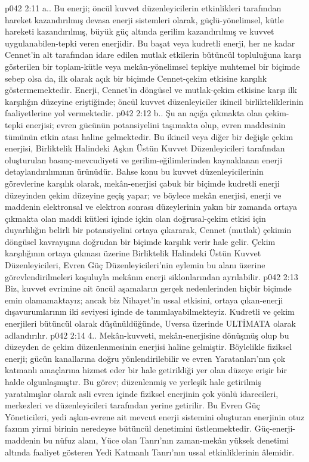 \vs p042 2:11 a.\bibnobreakspace {}. Bu enerji; öncül kuvvet düzenleyicilerin etkinlikleri tarafından hareket kazandırılmış devasa enerji sistemleri olarak, güçlü\hyp{}yönelimsel, kütle hareketi kazandırılmış, büyük güç altında gerilim kazandırılmış ve kuvvet uygulanabilen\hyp{}tepki veren enerjidir. Bu başat veya kudretli enerji, her ne kadar Cennet’in alt tarafından idare edilen mutlak etkilerin bütüncül topluluğuna karşı gösterilen bir toplam\hyp{}kütle veya mekân\hyp{}yönelimsel tepkiye muhtemel bir biçimde sebep olsa da, ilk olarak açık bir biçimde Cennet\hyp{}çekim etkisine karşılık göstermemektedir. Enerji, Cennet’in döngüsel ve mutlak\hyp{}çekim etkisine karşı ilk karşılığın düzeyine eriştiğinde; öncül kuvvet düzenleyiciler ikincil birlikteliklerinin faaliyetlerine yol vermektedir.
\vs p042 2:12 b.\bibnobreakspace {}. Şu an açığa çıkmakta olan çekim\hyp{}tepki enerjisi; evren gücünün potansiyelini taşımakta olup, evren maddesinin tümünün etkin atası haline gelmektedir. Bu ikincil veya diğer bir değişle çekim enerjisi, Birliktelik Halindeki Aşkın Üstün Kuvvet Düzenleyicileri tarafından oluşturulan basınç\hyp{}mevcudiyeti ve gerilim\hyp{}eğilimlerinden kaynaklanan enerji detaylandırılımının ürünüdür. Bahse konu bu kuvvet düzenleyicilerinin görevlerine karşılık olarak, mekân\hyp{}enerjisi çabuk bir biçimde kudretli enerji düzeyinden çekim düzeyine geçiş yapar; ve böylece mekân enerjisi, enerji ve maddenin elektronsal ve elektron sonrası düzeylerinin yakın bir zamanda ortaya çıkmakta olan maddi kütlesi içinde içkin olan doğrusal\hyp{}çekim etkisi için duyarlılığın belirli bir potansiyelini ortaya çıkararak, Cennet (mutlak) çekimin döngüsel kavrayışına doğrudan bir biçimde karşılık verir hale gelir. Çekim karşılığının ortaya çıkması üzerine Birliktelik Halindeki Üstün Kuvvet Düzenleyicileri, Evren Güç Düzenleyicileri’nin eylemin bu alanı üzerine görevlendirilmeleri koşuluyla mekânın enerji siklonlarından ayrılabilir.
\vs p042 2:13 Biz, kuvvet evrimine ait öncül aşamaların gerçek nedenlerinden hiçbir biçimde emin olamamaktayız; ancak biz Nihayet’in ussal etkisini, ortaya çıkan\hyp{}enerji dışavurumlarının iki seviyesi içinde de tanımlayabilmekteyiz. Kudretli ve çekim enerjileri bütüncül olarak düşünüldüğünde, Uversa üzerinde ULTİMATA olarak adlandırılır.
\vs p042 2:14 4.\bibnobreakspace {}. Mekân\hyp{}kuvveti, mekân\hyp{}enerjisine dönüşmüş olup bu düzeyden de çekim düzenlenmesinin enerjisi haline gelmiştir. Böylelikle fiziksel enerji; gücün kanallarına doğru yönlendirilebilir ve evren Yaratanları’nın çok katmanlı amaçlarına hizmet eder bir hale getirildiği yer olan düzeye erişir bir halde olgunlaşmıştır. Bu görev; düzenlenmiş ve yerleşik hale getirilmiş yaratılmışlar olarak asli evren içinde fiziksel enerjinin çok yönlü idarecileri, merkezleri ve düzenleyicileri tarafından yerine getirilir. Bu Evren Güç Yöneticileri, yedi aşkın\hyp{}evrene ait mevcut enerji sistemini oluşturan enerjinin otuz fazının yirmi birinin neredeyse bütüncül denetimini üstlenmektedir. Güç\hyp{}enerji\hyp{}maddenin bu nüfuz alanı, Yüce olan Tanrı’nın zaman\hyp{}mekân yüksek denetimi altında faaliyet gösteren Yedi Katmanlı Tanrı’nın ussal etkinliklerinin âlemidir.

